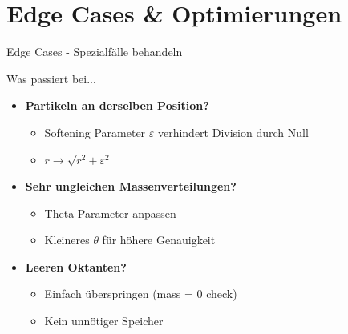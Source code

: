\documentclass[xcolor=dvipsnames]{beamer}
\begin{document}
\section{Edge Cases \& Optimierungen}

\begin{frame}{Edge Cases - Spezialfälle behandeln}
\begin{block}{Was passiert bei...}
\end{block}

\begin{itemize}
    \item \textbf{Partikeln an derselben Position?}
    \begin{itemize}
        \item Softening Parameter $\varepsilon$ verhindert Division durch Null
        \item $r \rightarrow \sqrt{r^2 + \varepsilon^2}$
    \end{itemize}

    \vspace{0.3cm}
    \item \textbf{Sehr ungleichen Massenverteilungen?}
    \begin{itemize}
        \item Theta-Parameter anpassen
        \item Kleineres $\theta$ für höhere Genauigkeit
    \end{itemize}

    \vspace{0.3cm}
    \item \textbf{Leeren Oktanten?}
    \begin{itemize}
        \item Einfach überspringen (mass = 0 check)
        \item Kein unnötiger Speicher
    \end{itemize}
\end{itemize}
\end{frame}
\end{document}
